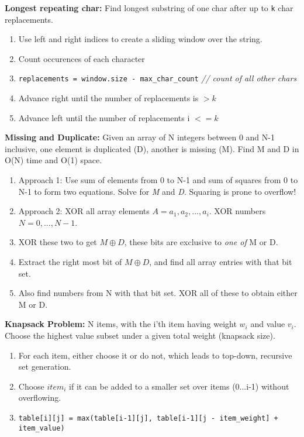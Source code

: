 \documentclass[12pt]{article}
\begin{document}
\vspace{5mm}
\noindent
\textbf{Longest repeating char:}
Find longest substring of one char after up to \texttt{k} char replacements.
\begin{enumerate}
\item Use left and right indices to create a sliding window over the string.
\item Count occurences of each character
\item \texttt{replacements = window.size - max\_char\_count} \emph{// count of all other chars}
\item Advance right until the number of replacements is $> k$
\item Advance left until the number of replacements i $<= k$
\end{enumerate}
\vspace{5mm}


\noindent
\textbf{Missing and Duplicate:}
Given an array of N integers between 0 and N-1 inclusive, one element is duplicated (D),
another is missing (M). Find M and D in O(N) time and O(1) space.
\begin{enumerate}
\item Approach 1: Use sum of elements from 0 to N-1 and sum of squares from 0 to N-1 to form two equations. Solve for \emph{M} and \emph{D}. Squaring is prone to overflow! 
\item Approach 2: XOR all array elements $A = {a_1, a_2, ..., a_i}$. XOR numbers $N = {0,...,N-1}$. 
\item XOR these two to get $M \oplus D$, these bits are exclusive to \emph{one of} M or D.
\item Extract the right most bit of $M \oplus D$, and find all array entries with that bit set.
\item Also find numbers from N with that bit set. XOR all of these to obtain either M or D. 
\end{enumerate}


\vspace{5mm}
\noindent
\textbf{Knapsack Problem:}
N items, with the i'th item having weight $w_i$ and value $v_i$. Choose the highest value
subset under a given total weight (knapsack size).
\begin{enumerate}
\item For each item, either choose it or do not, which leads to top-down, recursive set generation.
\item Choose $item_i$ if it can be added to a smaller set over items (0...i-1) without overflowing. 
\item \texttt{table[i][j] = max(table[i-1][j], table[i-1][j - item\_weight] + item\_value)}
\end{enumerate}
\end{document}
